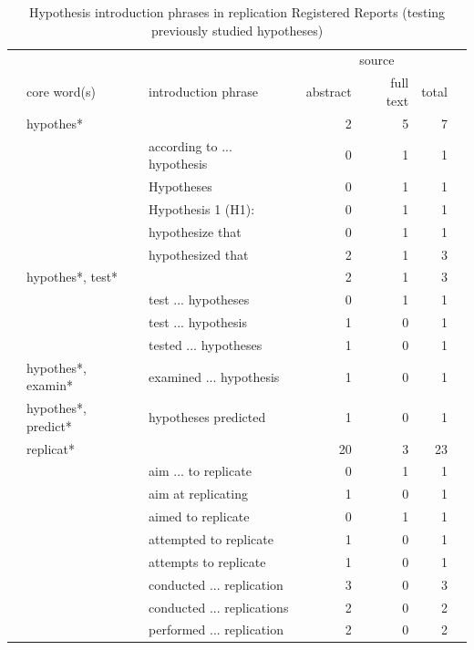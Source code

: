 \documentclass[british,,jou,floatsintext]{apa6}
\begin{document}
\begin{table}[tbp]

\begin{center}
\begin{threeparttable}

\caption{\label{tab:unnamed-chunk-7}Hypothesis introduction phrases in replication Registered Reports (testing previously studied hypotheses)}

\footnotesize{

\begin{tabular}{lllrrrr}
\toprule
 &  &  & \multicolumn{3}{c}{source}  &\\
\cmidrule(r){4-6}
 & core word(s) & introduction phrase & abstract & full text & total & \\
\midrule
 & hypothes* &  & 2 & 5 & 7 & \\
 &  & according to ... hypothesis & 0 & 1 & 1 & \\
 &  & Hypotheses & 0 & 1 & 1 & \\
 &  & Hypothesis 1 (H1): & 0 & 1 & 1 & \\
 &  & hypothesize that & 0 & 1 & 1 & \\
 &  & hypothesized that & 2 & 1 & 3 & \\ \midrule
 & hypothes*, test* &  & 2 & 1 & 3 & \\
 &  & test ... hypotheses & 0 & 1 & 1 & \\
 &  & test ... hypothesis & 1 & 0 & 1 & \\
 &  & tested ... hypotheses & 1 & 0 & 1 & \\ \midrule
 & hypothes*, examin* & examined ... hypothesis & 1 & 0 & 1 & \\ \midrule
 & hypothes*, predict* & hypotheses predicted & 1 & 0 & 1 & \\ \midrule
 & replicat* &  & 20 & 3 & 23 & \\
 &  & aim ... to replicate & 0 & 1 & 1 & \\
 &  & aim at replicating & 1 & 0 & 1 & \\
 &  & aimed to replicate & 0 & 1 & 1 & \\
 &  & attempted to replicate & 1 & 0 & 1 & \\
 &  & attempts to replicate & 1 & 0 & 1 & \\
 &  & conducted ... replication & 3 & 0 & 3 & \\
 &  & conducted ... replications & 2 & 0 & 2 & \\
 &  & performed ... replication & 2 & 0 & 2 & \\

\end{tabular}}
\end{threeparttable}
\end{center}
\end{table}
\end{document}
